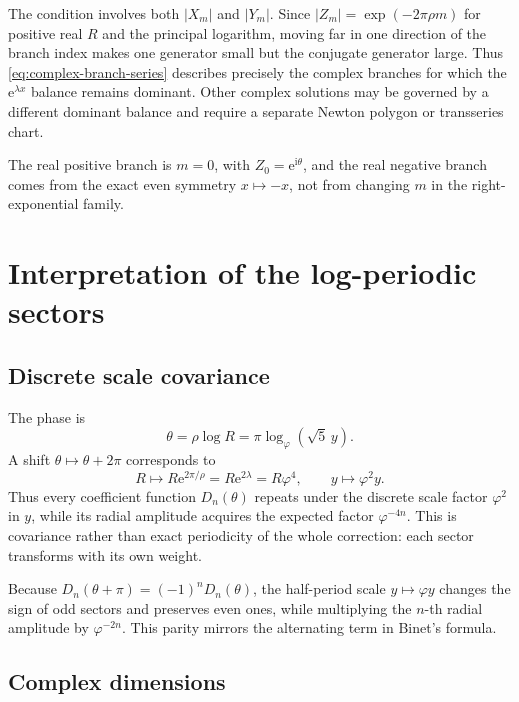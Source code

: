 \documentclass[11pt,oneside]{article}
\numberwithin{equation}{section}
\theoremstyle{plain}
\theoremstyle{definition}
\theoremstyle{remark}
\newcommand{\e}{\mathrm e}
\newcommand{\ii}{\mathrm i}
\begin{document}
The condition involves both \(|X_m|\) and \(|Y_m|\).  Since
\(
 |Z_m|=\exp(-2\pi\rho m)
\) for positive real \(R\) and the principal logarithm, moving far in one
direction of the branch index makes one generator small but the conjugate
generator large.  Thus \cref{eq:complex-branch-series} describes precisely
the complex branches for which the \(\e^{\lambda x}\) balance remains
dominant.  Other complex solutions may be governed by a different dominant
balance and require a separate Newton polygon or transseries chart.

The real positive branch is \(m=0\), with
\(Z_0=\e^{\ii\theta}\), and the real negative branch comes from the exact
even symmetry \(x\mapsto-x\), not from changing \(m\) in the right-exponential
family.

\section{Interpretation of the log-periodic sectors}\label{sec:interpretation}

\subsection{Discrete scale covariance}

The phase is
\begin{equation}\label{eq:phase-logR}
 \theta=\rho\log R=\pi\log_{\varphi}(\sqrt5\,y).
\end{equation}
A shift \(\theta\mapsto\theta+2\pi\) corresponds to
\begin{equation}\label{eq:scale-period}
 R\mapsto R\e^{2\pi/\rho}=R\e^{2\lambda}=R\varphi^4,
 \qquad
 y\mapsto\varphi^2y.
\end{equation}
Thus every coefficient function \(D_n(\theta)\) repeats under the discrete
scale factor \(\varphi^2\) in \(y\), while its radial amplitude acquires the
expected factor \(\varphi^{-4n}\).  This is covariance rather than exact
periodicity of the whole correction: each sector transforms with its own
weight.

Because \(D_n(\theta+\pi)=(-1)^nD_n(\theta)\), the half-period scale
\(y\mapsto\varphi y\) changes the sign of odd sectors and preserves even
ones, while multiplying the \(n\)-th radial amplitude by \(\varphi^{-2n}\).
This parity mirrors the alternating term in Binet's formula.

\subsection{Complex dimensions}
\end{document}
